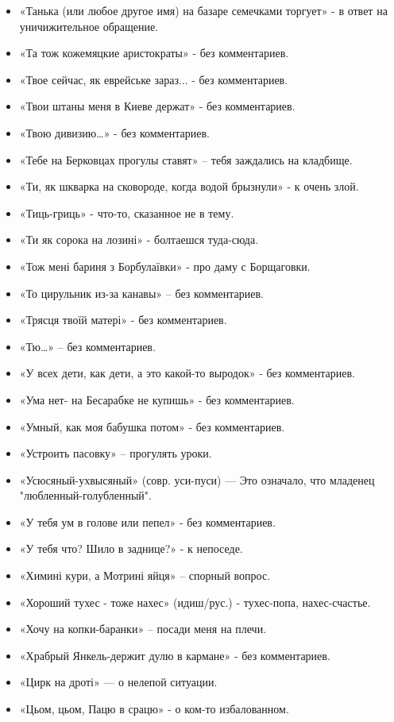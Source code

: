 \begin{itemize}
\item  «Танька (или любое другое имя) на базаре семечками торгует» - в ответ на уничижительное обращение.
\item  «Та тож кожемяцкие аристократы» - без комментариев.
\item  «Твое сейчас, як еврейське зараз... - без комментариев.
\item  «Твои штаны меня в Киеве держат» - без комментариев.
\item  «Твою дивизию…» - без комментариев.
\item  «Тебе на Берковцах прогулы ставят» – тебя заждались на кладбище.
\item  «Ти, як шкварка на сковороде, когда водой брызнули» - к очень злой.
\item  «Тиць-гриць» - что-то, сказанное не в тему.
\item  «Ти як сорока на лозині» - болтаешся туда-сюда.
\item  «Тож мені бариня з Борбулаївки» - про даму с Борщаговки.
\item  «То цирульник из-за канавы» – без комментариев.
\item  «Трясця твоїй матері» - без комментариев.
\item  «Тю…» – без комментариев.
\item  «У всех дети, как дети, а это какой-то выродок» - без комментариев.
\item  «Ума нет- на Бесарабке не купишь» - без комментариев.
\item  «Умный, как моя бабушка потом» - без комментариев.
\item  «Устроить пасовку» – прогулять уроки.
\item  «Усюсяный-ухвысяный» (совр. уси-пуси) — Это означало, что младенец "любленный-голубленный".
\item  «У тебя ум в голове или пепел» - без комментариев.
\item  «У тебя что? Шило в заднице?» - к непоседе.
\item  «Химині кури, а Мотрині яйця» – спорный вопрос.
\item  «Хороший тухес - тоже нахес» (идиш/рус.) - тухес-попа, нахес-счастье. 
\item  «Хочу на копки-баранки» – посади меня на плечи.
\item  «Храбрый  Янкель-держит дулю в кармане» - без комментариев.
\item  «Цирк на дроті» — о нелепой ситуации.
\item  «Цьом, цьом, Пацю в срацю» - о ком-то избалованном.

\end{itemize}
